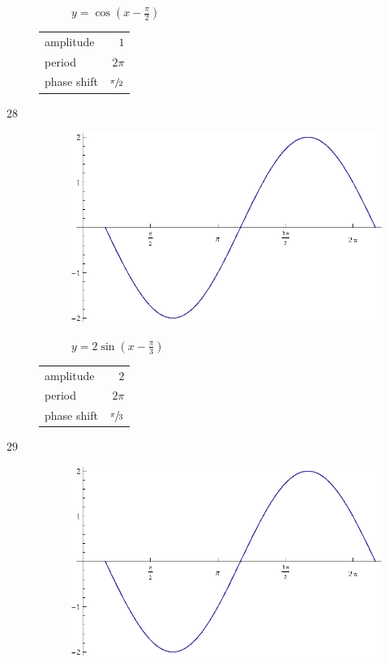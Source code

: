 \documentclass{exam}
\begin{document}
\begin{description}
\begin{figure}[H]
          $y = \cos \left( x - \frac{\pi}{2} \right)$
        \end{figure}

        \begin{tabular}[H]{lr}
          \toprule
          amplitude   & $1$ \\
          period      & $2 \pi$ \\
          phase shift & $\sfrac{\pi}{2}$ \\
          \bottomrule
        \end{tabular}

      \item[28]
        \begin{figure}[H]
          \centering
          \includegraphics[scale=0.8]{exercise28.eps}

          $y = 2 \sin \left( x - \frac{\pi}{3} \right)$
        \end{figure}

        \begin{tabular}[H]{lr}
          \toprule
          amplitude   & $2$ \\
          period      & $2 \pi$ \\
          phase shift & $\sfrac{\pi}{3}$ \\
          \bottomrule
        \end{tabular}

      \item[29]
        \begin{figure}[H]
          \centering
          \includegraphics[scale=0.8]{exercise29.eps}


\end{figure}
\end{description}
\end{document}
